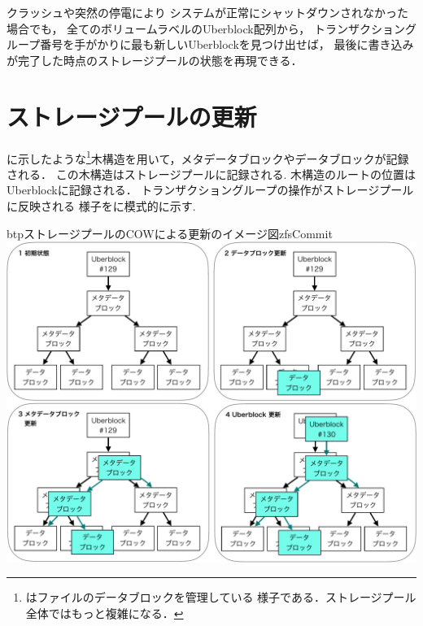 クラッシュや突然の停電により
システムが正常にシャットダウンされなかった場合でも，
全てのボリュームラベルのUberblock配列から，
トランザクショングループ番号を手がかりに最も新しいUberblockを見つけ出せば，
最後に書き込みが完了した時点のストレージプールの状態を再現できる．


\section{ストレージプールの更新}
に示したような\footnote{
  はファイルのデータブロックを管理している
  様子である．ストレージプール全体ではもっと複雑になる．
}木構造を用いて，メタデータブロックやデータブロックが記録される．
この木構造はストレージプールに記録される.
木構造のルートの位置はUberblockに記録される．
トランザクショングループの操作がストレージプールに反映される
様子をに模式的に示す.

\begin{myfig}{btp}{ストレージプールのCOWによる更新のイメージ図}{zfsCommit}
  \centering\includegraphics[scale=0.6]{Fig/zfsCommit-crop.pdf}
\end{myfig}

